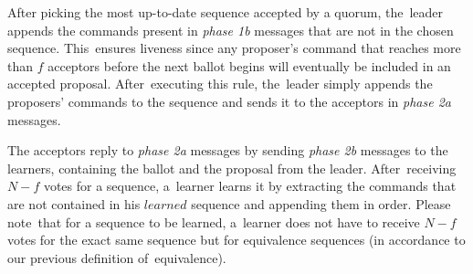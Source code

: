 \documentclass[algorithms,article,accept,moreauthors,pdftex,10pt,a4paper]{Definitions/mdpi}
\begin{document}
After picking the most up-to-date sequence accepted by a quorum, the~leader appends the commands present in \textit{phase 1b} messages that are not in the chosen sequence. This~ensures liveness since any proposer's command that reaches more than $f$ acceptors before the next ballot begins will eventually be included in an accepted proposal. After~executing this rule, the~leader simply appends the proposers' commands to the sequence and sends it to the acceptors in \textit{phase 2a} messages.\par

The acceptors reply to \textit{phase 2a} messages by sending \textit{phase 2b} messages to the learners, containing the ballot and the proposal from the leader. After~receiving $N-f$ votes for a sequence, a~learner learns it by extracting the commands that are not contained in his $learned$ sequence and appending them in order. Please note~that for a sequence to be learned, a~learner does not have to receive $N-f$ votes for the exact same sequence but for equivalence sequences (in accordance to our previous definition of~equivalence).
\end{document}
